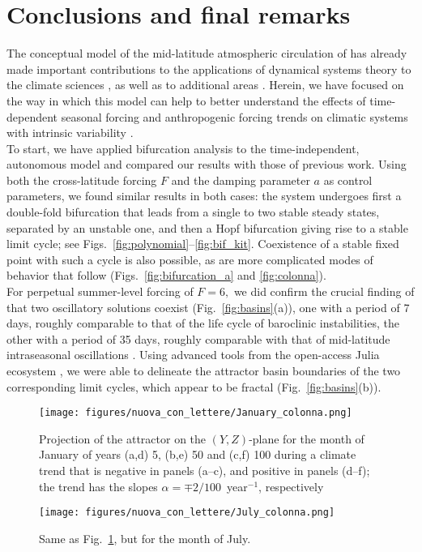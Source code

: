 \documentclass[%
 aip, cha,
 amsmath,amssymb,
 reprint,%
author-year,%
]{revtex4-1}
\newcommand{\0}{\mathbf 0}
\begin{document}
\section{Conclusions and final remarks}
\label{sec:concl}

The conceptual model of the mid-latitude atmospheric circulation of \cite{lorenz84,lorenz90} has already made important contributions to the applications of dynamical systems theory to the climate sciences \citep{shilnikov, vanveen2001, Broer, freire2008multistability}, as well as to additional areas \citep{mangiarotti}. Herein, we have focused on the way in which this model can help to better understand the effects of time-dependent seasonal forcing and anthropogenic forcing trends on climatic systems with intrinsic variability \citep{Ghil.Lucar.2020}. \\
To start, we have applied bifurcation analysis to the time-independent, autonomous model and compared our results with those of previous work. Using both the cross-latitude forcing $F$ and the damping parameter $a$ as control parameters, we found similar results in both cases: the system undergoes first a double-fold bifurcation that leads from a single to two stable steady states, separated by an unstable one, and then a Hopf bifurcation giving rise to a stable limit cycle; see Figs.~\ref{fig:polynomial}--\ref{fig:bif_kit}. Coexistence of a stable fixed point with such a cycle is also possible, as are more complicated modes of behavior that follow (Figs.~\ref{fig:bifurcation_a} and \ref{fig:colonna}). \\
For perpetual summer-level forcing of $F=6,$ we did confirm the crucial finding of \cite{lorenz90} that two oscillatory solutions coexist (Fig.~\ref{fig:basins}(a)), one with a period of 7 days, roughly comparable to that of the life cycle of baroclinic instabilities, the other with a period of 35 days, roughly comparable with that of mid-latitude intraseasonal oscillations \citep{ghil_S2S}. Using advanced tools from the open-access Julia ecosystem \citep{Datseris2018,Datseris.2022}, we were able to delineate the attractor basin boundaries of the two corresponding limit cycles, which appear to be fractal (Fig.~\ref{fig:basins}(b)).
 

\begin{figure*}[!ht]
	\texttt{[image: figures/nuova\_con\_lettere/January\_colonna.png]}
	\caption{Projection of the attractor on the $(Y,Z)$-plane for the month of January of years (a,d) 5, (b,e) 50 and (c,f) 100 during a climate trend that is negative in panels (a--c), and positive in panels (d--f); the trend has the slopes $\alpha = \mp 2/100$~year$^{-1}$, respectively}
	\label{fig:january_negative}
\end{figure*}
\begin{figure*}[!hb]
	\texttt{[image: figures/nuova\_con\_lettere/July\_colonna.png]}
	\caption{Same as Fig.~\ref{fig:january_negative}, but for the month of July.}
	\label{fig:july_negative}	
\end{figure*}
\end{document}
